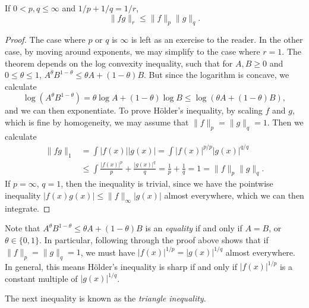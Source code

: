 \begin{theorem}[H\"{o}lder]
  If $0 < p,q \leq \infty$ and $1/p + 1/q = 1/r$,
  \[ \| f g \|_r \leq \| f \|_p \| g \|_q. \]
\end{theorem}
\begin{proof}
  The case where $p$ or $q$ is $\infty$ is left as an exercise to the reader. In the other case, by moving around exponents, we may simplify to the case where $r = 1$. The theorem depends on the log convexity inequality, such that for $A,B \geq 0$ and $0 \leq \theta \leq 1$, $A^\theta B^{1 - \theta} \leq \theta A + (1 - \theta) B$. But since the logarithm is concave, we calculate
  \[ \log(A^\theta B^{1 - \theta}) = \theta \log A + (1 - \theta) \log B \leq \log(\theta A + (1 - \theta) B), \]
  and we can then exponentiate. To prove H\"{o}lder's inequality, by scaling $f$ and $g$, which is fine by homogeneity, we may assume that $\| f \|_p = \| g \|_q = 1$. Then we calculate
  \begin{align*}
    \| f g \|_1 &= \int |f(x)| |g(x)| = \int |f(x)|^{p/p} |g(x)|^{q/q}\\
    &\leq \int \frac{|f(x)|^p}{p} + \frac{|g(x)|^q}{q} = \frac{1}{p} + \frac{1}{q} = 1 = \| f \|_p \| g \|_q.
  \end{align*}
  If $p = \infty$, $q = 1$, then the inequality is trivial, since we have the pointwise inequality $|f(x) g(x)| \leq \| f \|_\infty |g(x)|$ almost everywhere, which we can then integrate.
\end{proof}

\begin{remark}
  Note that $A^\theta B^{1-\theta} \leq \theta A + (1 - \theta) B$ is an \emph{equality} if and only if $A = B$, or $\theta \in \{ 0, 1 \}$. In particular, following through the proof above shows that if $\| f \|_p = \| g \|_q = 1$, we must have $|f(x)|^{1/p} = |g(x)|^{1/q}$ almost everywhere. In general, this means H\"{o}lder's inequality is sharp if and only if $|f(x)|^{1/p}$ is a constant multiple of $|g(x)|^{1/q}$.
\end{remark}

The next inequality is known as the \emph{triangle inequality}.

